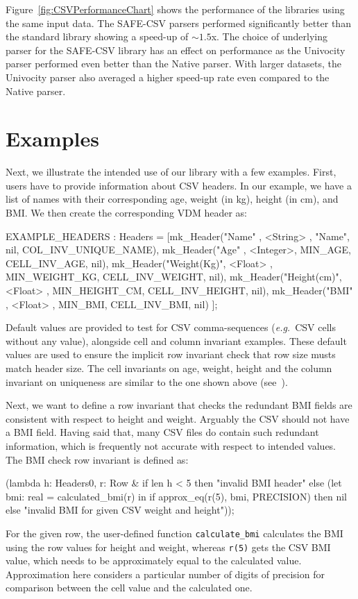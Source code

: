 \documentclass[runningheads,a4paper]{llncs}
\begin{document}
 Figure~\ref{fig:CSVPerformanceChart} shows the performance of the libraries using the same input data. The SAFE-CSV parsers performed significantly better than the standard library showing a speed-up of \(\sim 1.5\)x. The choice of underlying parser for the SAFE-CSV library has an effect on performance as the Univocity parser performed even better than the Native parser. With larger datasets, the Univocity parser also averaged a higher speed-up rate even compared to the Native parser.

\section{Examples}\label{sec:Examples}

Next, we illustrate the intended use of our library with a few examples. First, users have to provide information about CSV headers. In our example, we have a list of names with their corresponding age, weight (in kg), height (in cm), and BMI. We then create the corresponding VDM header as:
%
\begin{vdmsl}[frame=none,basicstyle=\ttfamily\scriptsize]
	EXAMPLE_HEADERS : Headers = 
        [mk_Header("Name"      , <String> ,  "Name", nil, COL_INV_UNIQUE_NAME),
         mk_Header("Age"       , <Integer>,       MIN_AGE, CELL_INV_AGE, nil),
         mk_Header("Weight(Kg)", <Float>  , MIN_WEIGHT_KG, CELL_INV_WEIGHT, nil),
         mk_Header("Height(cm)", <Float>  , MIN_HEIGHT_CM, CELL_INV_HEIGHT, nil),
         mk_Header("BMI"       , <Float>  ,       MIN_BMI, CELL_INV_BMI, nil) ];
\end{vdmsl} 
%
Default values are provided to test for CSV comma-sequences (\textit{e.g.}~CSV cells without any value), alongside cell and column invariant examples. These default values are used to ensure the implicit row invariant check that row size musts match header size. The cell invariants on age, weight, height and the column invariant on uniqueness are similar to the one shown above (see~).

Next, we want to define a row invariant that checks the redundant BMI fields are consistent with respect to height and weight. Arguably the CSV should not have a BMI field. Having said that, many CSV files do contain such redundant information, which is frequently not accurate with respect to intended values. The BMI check row invariant is defined as:
%
\begin{vdmsl}[frame=none,basicstyle=\ttfamily\scriptsize]    
    (lambda h: Headers0, r: Row &
    	  if len h < 5 then "invalid BMI header"
    	  else 
		      (let bmi: real = calculated_bmi(r) in
			      if approx_eq(r(5), bmi, PRECISION) then nil 
			      else "invalid BMI for given CSV weight and height"));
\end{vdmsl}
%
For the given row, the user-defined function \texttt{calculate\_bmi} calculates the BMI using the row values for height and weight, whereas \texttt{r(5)} gets the CSV BMI value, which needs to be approximately equal to the calculated value. Approximation here considers a particular number of digits of precision for comparison between the cell value and the calculated one.    
\end{document}
